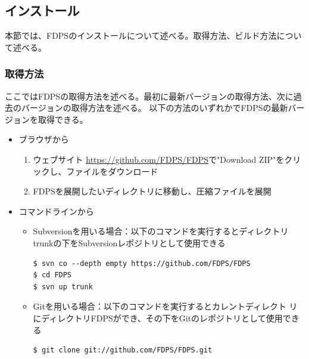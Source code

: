 \subsection{インストール}
本節では、FDPSのインストールについて述べる。取得方法、ビルド方法について述べる。
\subsubsection{取得方法}
ここではFDPSの取得方法を述べる。最初に最新バージョンの取得方法、次に過去のバージョンの取得方法を述べる。
以下の方法のいずれかでFDPSの最新バージョンを取得できる。
\begin{itemize}
\item ブラウザから
  \begin{enumerate}
  \item ウェブサイト \url{https://github.com/FDPS/FDPS}で"Download ZIP"をクリックし、ファイルをダウンロード
  \item FDPSを展開したいディレクトリに移動し、圧縮ファイルを展開
  \end{enumerate}

\item コマンドラインから
  \begin{itemize}    
  \item Subversionを用いる場合：以下のコマンドを実行するとディレクトリ
    trunkの下をSubversionレポジトリとして使用できる
    \begin{screen}
\begin{verbatim}
$ svn co --depth empty https://github.com/FDPS/FDPS
$ cd FDPS
$ svn up trunk
\end{verbatim}
    \end{screen}

  \item Gitを用いる場合：以下のコマンドを実行するとカレントディレクト
    リにディレクトリFDPSができ、その下をGitのレポジトリとして使用できる
    \begin{screen}
\begin{verbatim}
$ git clone git://github.com/FDPS/FDPS.git
\end{verbatim}
    \end{screen}    

  \end{itemize}

\end{itemize}
